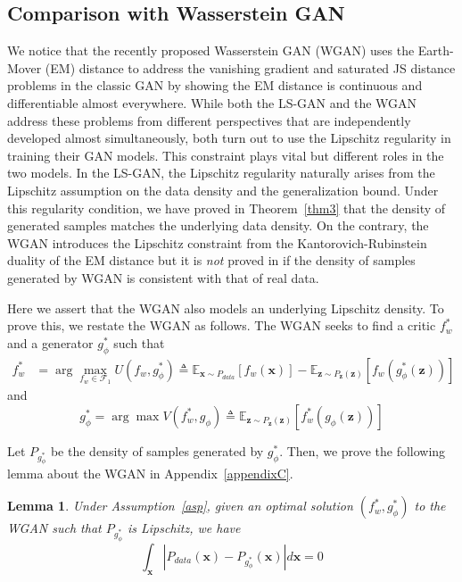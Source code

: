 \documentclass[11pt,fullpage, letterpaper,twoside]{article}
\newtheorem{lemma}{Lemma}
\newcommand{\1}[1]{\mathds{1}_{\left[#1\right]}}
\begin{document}
\subsection{Comparison with Wasserstein GAN}\label{sec:wgan}
We notice that the recently proposed Wasserstein GAN (WGAN) \cite{wgan17} uses the Earth-Mover (EM) distance to address the vanishing gradient and saturated JS distance problems in the classic GAN by showing the EM distance is continuous and differentiable almost everywhere.  While both the LS-GAN and the WGAN address these problems from different perspectives that are independently developed almost simultaneously, both turn out to use the Lipschitz regularity in training their GAN models. This constraint plays vital but different roles in the two models.  In the LS-GAN, the Lipschitz regularity naturally arises from the Lipschitz assumption on the data density and the generalization bound. Under this regularity condition, we have proved in Theorem~\ref{thm3} that the density of generated samples matches the underlying data density. On the contrary, the WGAN introduces the Lipschitz constraint from the Kantorovich-Rubinstein duality of the EM distance but it is {\em not} proved in \cite{wgan17} if the density of samples generated by WGAN is consistent with that of real data.

Here we assert that the WGAN also models an underlying Lipschitz density.  To prove this, we restate the WGAN as follows. The WGAN seeks to find a critic $f_w^*$ and a generator $g_\phi^*$ such that
\begin{equation}\label{eq:critic}
\begin{aligned}
f_w^* &= \arg\max_{f_w\in\mathcal F_1} U(f_w,g_\phi^*)
\triangleq\mathbb E_{\mathbf x\sim P_{data}} [f_w(\mathbf x)] - \mathbb E_{\mathbf z\sim P_{\mathbf z}(\mathbf z)} [f_w(g_\phi^*(\mathbf z))]
\end{aligned}
\end{equation}
and
\begin{equation}\label{eq:gen}
g_\phi^*=\arg\max V(f_w^*,g_\phi)\triangleq\mathbb E_{\mathbf z\sim P_{\mathbf z}(\mathbf z)} [f_w^*(g_\phi(\mathbf z))]
\end{equation}

Let $P_{g_\phi^*}$ be the density of samples generated by $g_\phi^*$. Then, we prove the following lemma about the WGAN in Appendix~\ref{appendixC}.

\begin{lemma}\label{lem:wgan}
{Under Assumption~\ref{asp}, given an optimal solution $(f_w^*,g_\phi^*)$ to the WGAN such that $P_{g_\phi^*}$ is Lipschitz, we have
$$
\int_{\mathbf x}|P_{data}(\mathbf x)-P_{g_\phi^*}(\mathbf x)|d\mathbf x=0
$$}
\end{lemma}
\end{document}
